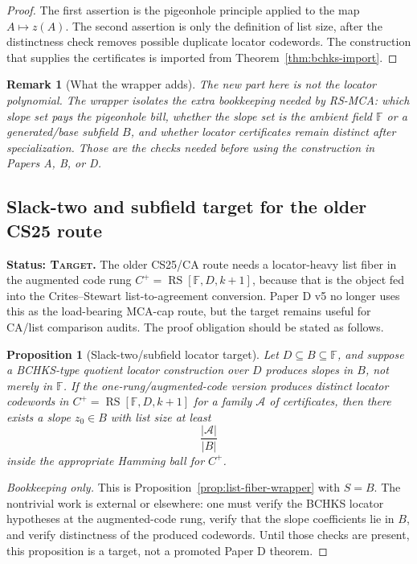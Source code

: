 \documentclass[11pt]{article}
\newtheorem{proposition}{Proposition}
\newtheorem{remark}{Remark}
\newcommand{\F}{\mathbb F}
\newcommand{\RS}{\operatorname{RS}}
\begin{document}
\begin{proof}
The first assertion is the pigeonhole principle applied to the map
\(A\mapsto z(A)\).  The second assertion is only the definition of list size,
after the distinctness check removes possible duplicate locator codewords.
The construction that supplies the certificates is imported from
Theorem~\ref{thm:bchks-import}.
\end{proof}

\begin{remark}[What the wrapper adds]
The new part here is not the locator polynomial.  The wrapper isolates the
extra bookkeeping needed by RS-MCA: which slope set pays the pigeonhole bill,
whether the slope set is the ambient field \(\F\) or a generated/base subfield
\(B\), and whether locator certificates remain distinct after specialization.
Those are the checks needed before using the construction in Papers A, B, or D.
\end{remark}

\subsection{Slack-two and subfield target for the older CS25 route}

\textbf{Status: \textsc{Target}.}
The older CS25/CA route needs a locator-heavy list fiber in the augmented code
rung \(C^+=\RS[\F,D,k+1]\), because that is the object fed into the
Crites--Stewart list-to-agreement conversion.  Paper D v5 no longer uses this
as the load-bearing MCA-cap route, but the target remains useful for CA/list
comparison audits.  The proof obligation should be stated as follows.

\begin{proposition}[Slack-two/subfield locator target]
\label{prop:slack-two-target}
Let \(D\subseteq B\subseteq\F\), and suppose a BCHKS-type quotient locator
construction over \(D\) produces slopes in \(B\), not merely in \(\F\).  If the
one-rung/augmented-code version produces distinct locator codewords in
\(C^+=\RS[\F,D,k+1]\) for a family \(\mathcal A\) of certificates, then there
exists a slope \(z_0\in B\) with list size at least
\[
  \frac{|\mathcal A|}{|B|}
\]
inside the appropriate Hamming ball for \(C^+\).
\end{proposition}

\begin{proof}[Bookkeeping only]
This is Proposition~\ref{prop:list-fiber-wrapper} with \(S=B\).  The nontrivial
work is external or elsewhere: one must verify the BCHKS locator hypotheses at
the augmented-code rung, verify that the slope coefficients lie in \(B\), and
verify distinctness of the produced codewords.  Until those checks are present,
this proposition is a target, not a promoted Paper D theorem.
\end{proof}
\end{document}
